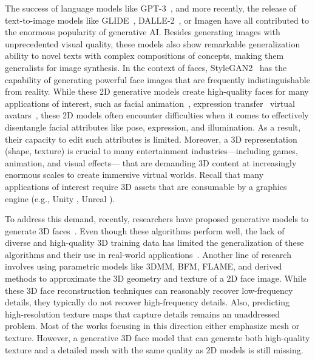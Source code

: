 \documentclass[10pt,twocolumn,letterpaper]{article}
\begin{document}
The success of language models like GPT-3~\cite{radford2019language}, and more recently, the release of text-to-image models like  GLIDE~\cite{Nichol2021GLIDETP}, DALLE-2~\cite{ramesh2022hierarchical}, or Imagen \cite{Saharia2022PhotorealisticTD} have all contributed to the enormous popularity of generative AI. Besides generating images with unprecedented visual quality, these models also show remarkable generalization ability to novel texts with complex compositions of concepts, making them generalists for image synthesis. In the context of faces, StyleGAN2~\cite{karras2020analyzing} has the capability of generating powerful face images that are frequently indistinguishable from reality. While these 2D generative models create high-quality faces for many applications of interest, such as facial animation~\cite{ichim2015dynamic, weise2011realtime}, expression transfer~\cite{kim2018deep, thies2016face2face, olivier2021facetunegan} virtual avatars~\cite{lombardi2018deep}, 
these 2D models often encounter difficulties when it comes to effectively  disentangle facial attributes like pose, expression, and illumination.  As a result, their capacity to edit such attributes is limited. Moreover, 
a  3D representation (shape, texture) is crucial to many entertainment industries—including games, animation, and visual effects— that are demanding 3D content at increasingly enormous scales to create immersive virtual worlds.  Recall that many applications of interest require 3D assets that are consumable by a graphics engine (e.g., Unity \cite{unity}, Unreal \cite{unrealengine}).


To address this demand, recently, researchers have proposed generative models to generate 3D faces~\cite{abrevaya2019decoupled, taherkhani2022controllable, gecer2020synthesizing}. Even though these algorithms perform well, the lack of diverse and high-quality 3D training data has limited the generalization of these algorithms and their use in real-world applications~\cite{toshpulatov2021generative}. Another line of research involves using parametric models like 3DMM\cite{3dmm}, BFM\cite{bfm}, FLAME\cite{3dmm}, and derived methods \cite{deca, occlusion_robust_mofa, deep3dface_recon, tewari, ringnet} to approximate the 3D geometry and texture of a 2D face image. While these 3D face reconstruction techniques can reasonably recover low-frequency details, they typically do not recover high-frequency details. Also, predicting high-resolution texture maps that capture details remains an unaddressed problem. Most of the works focusing in this direction either emphasize mesh or texture. However, a generative 3D face model that can generate both high-quality texture and a detailed mesh with the same quality as 2D models is still missing.  
\end{document}
